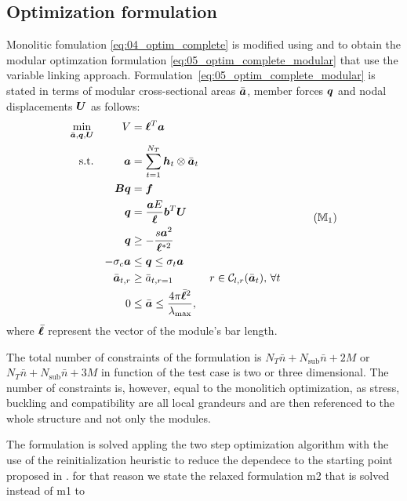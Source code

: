 \subsection{Optimization formulation}
Monolitic fomulation \ref{eq:04_optim_complete} is modified using  and  to obtain the modular optimzation formulation \ref{eq:05_optim_complete_modular} that use the variable linking approach. Formulation~\ref{eq:05_optim_complete_modular} is stated in terms of modular cross-sectional areas $\bar{\bm{a}}$, member forces $\bm{q}$ and nodal displacements $\bm{U}$ as follows:
\begin{equation}
    \begin{aligned}
    \min_{\bar{\vect{a}}, \vect{q}, \vect{U}}   && V &= \vect{\ell}^{T}\vect{a}\\
    \textrm{s.t.}  && \vect{a} &= \sum_{t=1}^{N_T} \vect{h}_t\otimes\bar{\vect{a}}_t \\ 
    && \matr{B}\vect{q} &= \vect{f} && \\
    && \vect{q} &= \frac{\vect{a}E}{\vect{\ell}}\vect{b}^T\vect{U} &&  \\
    && \vect{q} &\geq -\frac{s\vect{a}^2}{\vect{\ell}^{*2}} &&  \\
    && -\sigma_c\vect{a} &\leq \vect{q} \leq \sigma_t\vect{a} &&  \\
    && \bar{\vect{a}}_{t,r}&\geq \bar{a}_{t,r=1} && r \in \mathcal{C}_{l,r}(\bar{\vect{a}}_t),\, \forall t \\
    && 0 &\leq \bar{\vect{a}} \leq \frac{4 \pi \bar{\vect{\ell}}^2}{\lambda_{\text{max}}}, \\
    \end{aligned}
    \tag{${\mathbb{M}}_\text{1}$}
    \label{eq:05_optim_complete_modular}
\end{equation}
where $\bar{\bm{\ell}}$ represent the vector of the module's bar length.
 
The total number of constraints of the formulation is $N_T\bar{n} +N_{\text{sub}}\bar{n}+2M$ or $N_T\bar{n} +N_{\text{sub}}\bar{n}+3M$ in function of the test case is two or three dimensional. The number of constraints is, however, equal to the monolitich optimization, as stress, buckling and compatibility are all local grandeurs and are then referenced to the whole structure and not only the modules.

The formulation is solved appling the two step optimization algorithm with the use of the reinitialization heuristic to reduce the dependece to the starting point proposed in . for that reason we state the relaxed formulation m2 that is solved instead of m1 to 

